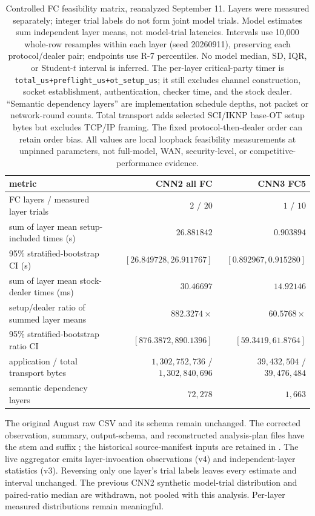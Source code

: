 \documentclass[11pt]{article}
\begin{document}
\begin{table}[ht]
\centering
\small
\begin{tabular}{@{}l rr@{}}
\toprule
metric & CNN2 all FC & CNN3 FC5\\
\midrule
FC layers / measured layer trials & $2$ / $20$ & $1$ / $10$\\
sum of layer mean setup-included times (s) & $26.881842$ & $0.903894$\\
95\% stratified-bootstrap CI (s) & $[26.849728,26.911767]$ & $[0.892967,0.915280]$\\
sum of layer mean stock-dealer times (ms) & $30.46697$ & $14.92146$\\
setup/dealer ratio of summed layer means & $882.3274\times$ & $60.5768\times$\\
95\% stratified-bootstrap ratio CI & $[876.3872,890.1396]$ & $[59.3419,61.8764]$\\
application / total transport bytes & $1{,}302{,}752{,}736$ / $1{,}302{,}840{,}696$ & $39{,}432{,}504$ / $39{,}476{,}484$\\
semantic dependency layers & $72{,}278$ & $1{,}663$\\
\bottomrule
\end{tabular}
\caption{Controlled FC feasibility matrix, reanalyzed September 11. Layers
were measured separately; integer trial labels do not form joint model trials.
Model estimates sum independent layer means, not model-trial latencies.
Intervals use 10,000 whole-row resamples within each layer (seed 20260911),
preserving each protocol/dealer pair; endpoints use R-7 percentiles.
No model median, SD, IQR, or Student-$t$ interval is inferred.
The per-layer critical-party timer is
\texttt{total\_us+preflight\_us+ot\_setup\_us}; it still excludes channel
construction, socket establishment, authentication, checker time, and the
stock dealer. ``Semantic dependency layers'' are implementation schedule
depths, not packet or network-round counts. Total transport adds selected
SCI/IKNP base-OT setup bytes but excludes TCP/IP framing. The fixed
protocol-then-dealer order can retain order bias. All values are local
loopback feasibility measurements at unpinned parameters, not full-model,
WAN, security-level, or competitive-performance evidence.}
\label{tab:cnnmatrix}
\end{table}

The original August raw CSV and its schema remain unchanged. The corrected
observation, summary, output-schema, and reconstructed analysis-plan files
have the stem  and suffix
; the historical source-manifest inputs are retained in
.
The live aggregator emits layer-invocation observations (v4) and
independent-layer statistics (v3). Reversing only one layer's trial labels
leaves every estimate and interval unchanged. The previous CNN2 synthetic
model-trial distribution and paired-ratio median are withdrawn, not pooled
with this analysis. Per-layer measured distributions remain meaningful.
\end{document}
